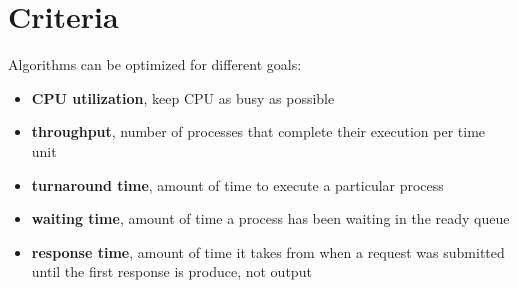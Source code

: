 \section{Criteria}
Algorithms can be optimized for different goals:
\begin{itemize}
\item \textbf{CPU utilization}, keep CPU as busy as possible
\item \textbf{throughput}, number of processes that complete their execution per time unit
\item \textbf{turnaround time}, amount of time to execute a particular process
\item \textbf{waiting time}, amount of time a process has been waiting in the ready queue
\item \textbf{response time}, amount of time it takes from when a request was submitted until the first response is produce, not output

\end{itemize}

